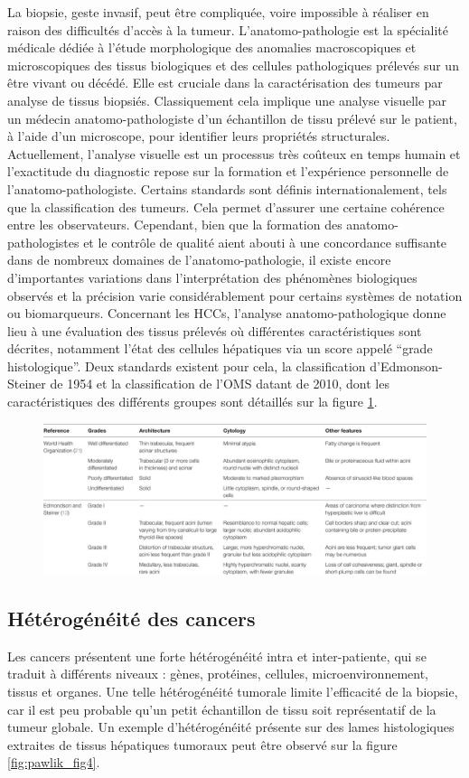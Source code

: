 \documentclass[]{memoir}
\begin{document}
La biopsie, geste invasif, peut être compliquée, voire impossible à réaliser en raison des
difficultés d’accès à la tumeur.
L’anatomo-pathologie est la spécialité médicale dédiée à l’étude morphologique des anomalies macroscopiques et microscopiques des tissus biologiques et des cellules pathologiques prélevés sur un être vivant ou décédé. Elle est cruciale dans la caractérisation des tumeurs par analyse de tissus biopsiés. Classiquement cela implique une analyse visuelle par un médecin anatomo-pathologiste d’un échantillon de tissu prélevé sur le patient, à l’aide d’un microscope, pour identifier leurs propriétés structurales. Actuellement, l’analyse visuelle est un processus très coûteux en temps humain et l’exactitude du diagnostic repose sur la formation et l’expérience personnelle de l’anatomo-pathologiste. Certains standards sont définis internationalement, tels que la classification des tumeurs. Cela permet d’assurer une certaine cohérence entre les observateurs. Cependant, bien que la formation des anatomo-pathologistes et le contrôle de qualité aient abouti à une concordance suffisante dans de nombreux domaines de l’anatomo-pathologie, il existe encore d’importantes variations dans l’interprétation des phénomènes biologiques observés et la précision varie considérablement pour certains systèmes de notation ou biomarqueurs.
Concernant les HCCs, l’analyse anatomo-pathologique donne lieu à une évaluation des tissus prélevés où différentes caractéristiques sont décrites, notamment l’état des cellules hépatiques via un score appelé “grade histologique”. Deux standards existent pour cela, la classification d’Edmonson-Steiner de 1954 et la classification de l’OMS datant de 2010, dont les caractéristiques des différents groupes sont détaillés sur la figure \ref{fig:martins2017_table1}.
\begin{figure}
\centering
\includegraphics[width=0.7\linewidth]{../HistologicalGradePrediction/images/martins2017_table1}
\label{fig:martins2017_table1}
\end{figure}


\subsection{Hétérogénéité des cancers}
Les cancers présentent une forte hétérogénéité intra et inter-patiente, qui se traduit à différents niveaux : gènes, protéines, cellules, microenvironnement, tissus et organes. Une telle hétérogénéité tumorale limite l’efficacité de la biopsie, car il est peu probable qu’un petit échantillon de tissu soit représentatif de la tumeur globale.
Un exemple d’hétérogénéité présente sur des lames histologiques extraites de tissus hépatiques tumoraux peut être observé sur la figure \ref{fig:pawlik_fig4}.
\end{document}
